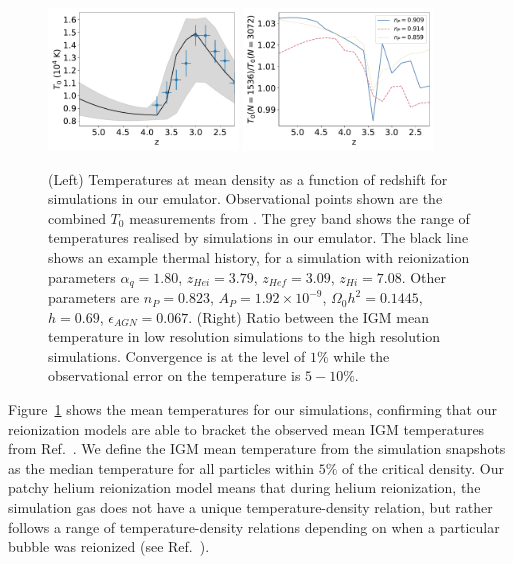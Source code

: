 \documentclass[a4paper,11pt]{article}
\begin{document}
\begin{figure}
\includegraphics[width=0.45\textwidth]{figures/mean-temperature.pdf}
\includegraphics[width=0.45\textwidth]{figures/mean-temperature-resolution.pdf}
 \caption{(Left) Temperatures at mean density as a function of redshift for simulations in our emulator. Observational points shown are the combined $T_0$ measurements from \protect\cite{Gaikwad:2021}.  The grey band shows the range of temperatures realised by simulations in our emulator. The black line shows an example thermal history, for a simulation with reionization parameters $\alpha_q = 1.80$, $z_{Hei} = 3.79$, $z_{Hef} = 3.09$, $z_{Hi} = 7.08$. Other parameters are $n_P = 0.823$, $A_P = 1.92 \times 10^{-9}$, $\Omega_0 h^2 = 0.1445$, $h = 0.69$, $\epsilon_{AGN} = 0.067$.
 (Right) Ratio between the IGM mean temperature in low resolution simulations to the high resolution simulations. Convergence is at the level of $1\%$ while the observational error on the temperature is $5-10\%$.
}
 \label{fig:meanigmtempdens}
\end{figure}

Figure~\ref{fig:meanigmtempdens} shows the mean temperatures for our simulations, confirming that our reionization models are able to bracket the observed mean IGM temperatures from Ref.~\cite{Gaikwad:2021}.
We define the IGM mean temperature from the simulation snapshots as the median temperature for all particles within $5\%$ of the critical density.
Our patchy helium reionization model means that during helium reionization, the simulation gas does not have a unique temperature-density relation, but rather follows a range of temperature-density relations depending on when a particular bubble was reionized (see Ref.~\cite{UptonSanderbeck:2020}).
\end{document}
